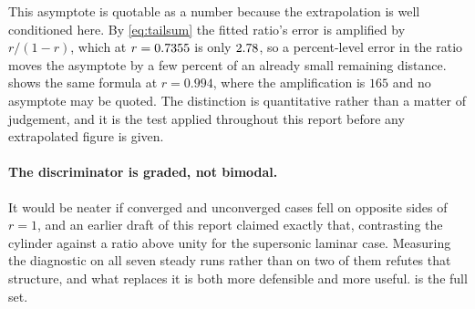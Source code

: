 This asymptote is quotable as a number because the extrapolation is well conditioned
here. By \cref{eq:tailsum} the fitted ratio's error is amplified by $r/(1-r)$, which at
$r=\num{0.7355}$ is only $\num{2.78}$, so a percent-level error in the
ratio moves the asymptote by a
few percent of an already small remaining distance.  shows the same
formula at $r=0.994$, where the amplification is $165$ and no asymptote may be quoted.
The distinction is quantitative rather than a matter of judgement, and it is the test
applied throughout this report before any extrapolated figure is given.

\paragraph{The discriminator is graded, not bimodal.} It would be neater if converged and
unconverged cases fell on opposite sides of $r=1$, and an earlier draft of this report
claimed exactly that, contrasting the cylinder against a ratio above unity for the
supersonic laminar case. Measuring the diagnostic on all seven steady runs rather than on
two of them refutes that structure, and what replaces it is both more defensible and more
useful.  is the full set.

